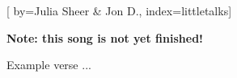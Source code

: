 
[%
    by={Julia Sheer \& Jon D.},
    index={littletalks}]


    \label{littletalks}

    \textbf{Note: this song is not yet finished!}

    \beginverse
        Example verse ...
    \endverse
\endsong
